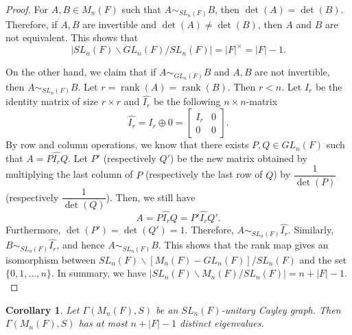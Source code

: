 \documentclass[12pt, a4paper]{amsart}
\newtheorem{cor}[thm]{Corollary}
\theoremstyle{definition}
\DeclareMathOperator{\rank}{\text{rank}}
\numberwithin{equation}{section}
\begin{document}
\begin{proof}
    For $A,B \in M_n(F)$ such that $A \sim_{SL_n(F)} B$, then $\det(A)=\det(B).$ Therefore, if $A,B$ are invertible and $\det(A) \neq \det(B)$, then $A$ and $B$ are not equivalent. This shows that 
    \[ |SL_n(F) \backslash GL_n(F) \slash SL_n(F)|=|F|^{\times}=|F|-1.\]
    
    
    
    On the other hand, we claim that if $A \sim_{GL_n(F)} B$ and $A,B$ are not invertible, then $A \sim_{SL_n(F)} B.$ Let $r=\rank(A)=\rank(B).$ Then $r<n$. Let $I_r$ be the identity matrix of size $r\times r$ and $\widehat{I_r}$ be the following $n\times n$-matrix 
    \[ 
\widehat{I_r} = I_r\oplus 0 = \begin{bmatrix} I_r & 0 \\ 0 & 0 \end{bmatrix}. \]
By row and column operations, we know that there exists $P,Q \in GL_n(F)$ such that $A=P \widehat{I_r} Q.$ Let $P'$ (respectively $Q'$) be the new matrix obtained by multiplying the last column of $P$ (respectively the last row of $Q$) by $\dfrac{1}{\det(P)}$ (respectively $\dfrac{1}{\det(Q)}$). Then, we still have 
\[ A = P\widehat{I_r} Q = P' \widehat{I_r} Q'.\]
Furthermore, $\det(P')=\det(Q')=1.$ Therefore, $A \sim_{SL_n(F)} \widehat{I_r}.$ Similarly, $B \sim_{SL_n(F)} \widehat{I_r}$, and hence $A \sim_{SL_n(F)} B.$ This shows that the rank map gives an isomorphism between $SL_n(F) \backslash [M_n(F)-GL_n(F)] \slash SL_n(F)$ and the set $\{0, 1, \ldots, n\}.$ In summary, we have  $|SL_n(F) \backslash M_n(F) \slash SL_n(F)|=n+|F|-1.$

\end{proof}

\begin{cor} \label{cor:upper-bound-sln}
    Let $\Gamma(M_n(F), S)$ be an $SL_n(F)$-unitary Cayley graph. Then $\Gamma(M_n(F), S)$ has at most $n+|F|-1$ distinct eigenvalues. 
\end{cor}
\end{document}
